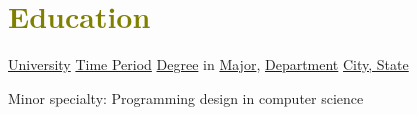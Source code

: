 

\section{\textcolor{olive}{\textbf{Education}}}
	\resumeSubHeadingListStart
		
    \resumeSubheading
        {\underline{University}}
        {\underline{Time Period}}
        {\underline{Degree} in \underline{Major}, \underline{Department}}
        {\textcolor{gray}{\footnotesize{\faMapMarker}} \underline{City, State}}

    \resumeItemListStart
        \item {
            Minor specialty: Programming design in computer science
        }
    \resumeItemListEnd
		  
	\resumeSubHeadingListEnd
